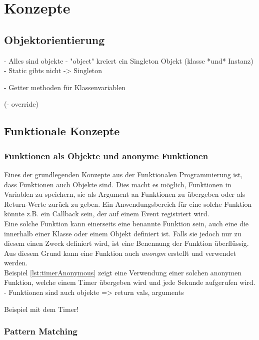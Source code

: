 \chapter{Konzepte}

\section{Objektorientierung}

- Alles sind objekte
- "object" kreiert ein Singleton Objekt (klasse *und* Instanz)
- Static gibts nicht -> Singleton

- Getter methoden für Klassenvariablen

(- override)


\section{Funktionale Konzepte}

\subsection{Funktionen als Objekte und anonyme Funktionen}

Eines der grundlegenden Konzepte aus der Funktionalen Programmierung ist,
dass Funktionen auch Objekte sind. Dies macht es möglich, Funktionen
in Variablen zu speichern, sie als Argument an Funktionen zu übergeben
oder als Return-Werte zurück zu geben. Ein Anwendungsbereich für eine
solche Funktion könnte z.B. ein Callback sein, der auf einem Event
registriert wird.\\

Eine solche Funktion kann einerseits eine benannte Funktion sein,
auch eine die innerhalb einer Klasse oder einem Objekt definiert ist.
Falls sie jedoch nur zu diesem einen Zweck definiert wird, ist eine 
Benennung der Funktion überflüssig. Aus diesem Grund kann eine Funktion
auch \emph{anonym} erstellt und verwendet werden.\\

Beispiel \ref{lst:timerAnonymous} zeigt eine Verwendung einer solchen 
anonymen Funktion, welche einem Timer übergeben wird und jede Sekunde
aufgerufen wird. \\


- Funktionen sind auch objekte => return vals, arguments

Beispiel mit dem Timer!

\subsection{Pattern Matching}

